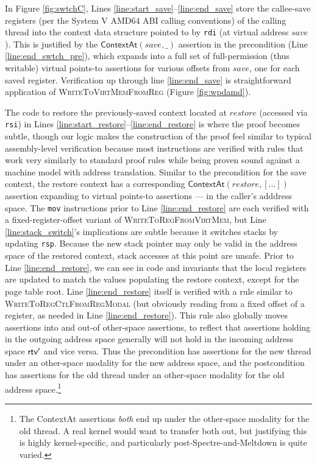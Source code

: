 In Figure \ref{fig:swtchC}, Lines \ref{line:start_save}--\ref{line:end_save} store the callee-save registers (per the System V AMD64 ABI calling conventions) of the calling
thread into the context data structure pointed to by \lstinline|rdi| (at virtual address $save$).
This is justified by the $\textsf{ContextAt}(save,\_)$ assertion in the precondition (Line \ref{line:end_swtch_pre}), which expands
into a full set of full-permission (thus writable) virtual points-to assertions for various offsets from $save$, one for each saved register.
Verification up through line \ref{line:end_save} is straightforward application of \textsc{WriteToVirtMemFromReg} (Figure \ref{fig:wpdamd}).

The code to restore the previously-saved context located at $restore$ (accessed via \lstinline|rsi|) in Lines
\ref{line:start_restore}--\ref{line:end_restore}
is where the proof becomes subtle, though our logic makes the construction of the proof feel similar to typical assembly-level verification
because most instructions are verified with rules that work very similarly to standard proof rules while being proven
sound against a machine model with address translation.
Similar to the precondition for the save context, the restore context has a corresponding $\mathsf{ContextAt}(restore,[\ldots])$
assertion expanding to virtual points-to assertions --- in the caller's adddress space.
The \lstinline|mov| instructions prior to Line \ref{line:end_restore} are each verified with a fixed-register-offset
variant of \textsc{WriteToRegFromVirtMem}, but
Line \ref{line:stack_switch}'s implications are subtle because it switches stacks by updating \lstinline|rsp|.
Because the new stack pointer may only be valid in the address space of the restored context, stack accesses at this point are unsafe.
Prior to Line \ref{line:end_restore}, we can see in code and invariants that the local registers are updated
to match the values populating the restore context, except for the page table root.
Line \ref{line:end_restore} itself is verified with a rule similar to \textsc{WriteToRegCtlFromRegModal} (but obviously
reading from a fixed offset of a register, as needed in Line \ref{line:end_restore}).
This rule also globally moves assertions into and out-of other-space assertions, to reflect that
assertions holding in the outgoing address space \rtv{} generally will not hold in the incoming address space $\textsf{rtv}'$
and vice versa. Thus the precondition has assertions for the new thread under an other-space modality for the new address space,
and the postcondition has assertions for the old thread under an other-space modality for the old address space.\footnote{
  The \textsf{ContextAt} assertions \emph{both} end up under the other-space modality for the old thread.
  A real kernel would want to transfer both out, but justifying this is highly kernel-specific,
  and particularly post-Spectre-and-Meltdown is quite varied.
}

